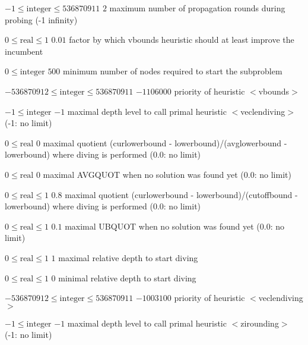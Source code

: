%
{$-1\leq\textrm{integer}\leq536870911$}%
{$2$}%
{maximum number of propagation rounds during probing (-1 infinity)}%
{}

%
{$0\leq\textrm{real}\leq1$}%
{$0.01$}%
{factor by which vbounds heuristic should at least improve the incumbent  }%
{}

%
{$0\leq\textrm{integer}$}%
{$500$}%
{minimum number of nodes required to start the subproblem}%
{}

%
{$-536870912\leq\textrm{integer}\leq536870911$}%
{$-1106000$}%
{priority of heuristic $<$vbounds$>$}%
{}

%
{$-1\leq\textrm{integer}$}%
{$-1$}%
{maximal depth level to call primal heuristic $<$veclendiving$>$ (-1: no limit)}%
{}

%
{$0\leq\textrm{real}$}%
{$0$}%
{maximal quotient (curlowerbound - lowerbound)/(avglowerbound - lowerbound) where diving is performed (0.0: no limit)}%
{}

%
{$0\leq\textrm{real}$}%
{$0$}%
{maximal AVGQUOT when no solution was found yet (0.0: no limit)}%
{}

%
{$0\leq\textrm{real}\leq1$}%
{$0.8$}%
{maximal quotient (curlowerbound - lowerbound)/(cutoffbound - lowerbound) where diving is performed (0.0: no limit)}%
{}

%
{$0\leq\textrm{real}\leq1$}%
{$0.1$}%
{maximal UBQUOT when no solution was found yet (0.0: no limit)}%
{}

%
{$0\leq\textrm{real}\leq1$}%
{$1$}%
{maximal relative depth to start diving}%
{}

%
{$0\leq\textrm{real}\leq1$}%
{$0$}%
{minimal relative depth to start diving}%
{}

%
{$-536870912\leq\textrm{integer}\leq536870911$}%
{$-1003100$}%
{priority of heuristic $<$veclendiving$>$}%
{}

%
{$-1\leq\textrm{integer}$}%
{$-1$}%
{maximal depth level to call primal heuristic $<$zirounding$>$ (-1: no limit)}%
{}


